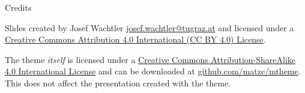 \documentclass{beamer}
\begin{document}
\begin{frame}{Credits}

  Slides created by Josef Wachtler 
  \href{mailto:josef.wachtler@tugraz.at}{josef.wachtler@tugraz.at} 
  and licensed under a
  \href{http://creativecommons.org/licenses/by/4.0/}{Creative Commons
        Attribution 4.0 International (CC BY 4.0) License}. 
  
  \begin{center}
    \begin{huge}
      \ccby
    \end{huge}
  \end{center}

  \begin{tiny}
    The theme \emph{itself} is licensed under a
    \href{http://creativecommons.org/licenses/by-sa/4.0/}{Creative Commons
    Attribution-ShareAlike 4.0 International License}
    and can be downloaded at 
    \href{https://github.com/matze/mtheme}{github.com/matze/mtheme}.
    This does not affect the presentation created with the theme.
  \end{tiny}

\end{frame}

\end{document}
